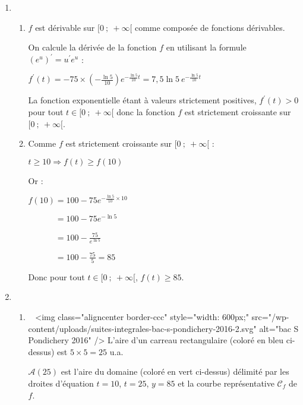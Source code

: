\begin{enumerate}
     \item
     \begin{enumerate}
          \item
          $f$ est dérivable sur $[0~;~+ \infty[$ comme composée de fonctions dérivables.
          \par
          On calcule la dérivée de la fonction $f$ en utilisant la formule $(e^u)^{\prime}=u^{\prime}e^u$ :
          \par
          $f^{\prime}(t)=-75 \times \left(-\frac{\ln 5}{10} \right){e}^{-\frac{\ln 5}{10}t}$$=7,5\ln5\ {e}^{-\frac{\ln 5}{10}t} $
          \par
          La fonction exponentielle étant à valeurs strictement positives, $f^{\prime}(t)  > 0$ pour tout $t \in [0~;~+ \infty[$ donc la fonction $f$ est strictement croissante sur $[0~;~+ \infty[$.
          \item
          Comme $f$ est strictement croissante sur $[0~;~+ \infty[$ :
          \par
          $t \geqslant 10 \Rightarrow f(t) \geqslant f(10)$
          \par
          Or :
          \par
          $f(10)=100-75{e}^{- \frac{\ln 5}{10} \times 10}$
          \par
          $\phantom{f(10)}=100-75{e}^{-\ln 5}$
          \par
          $\phantom{f(10)}=100-\frac{75}{{e}^{\ln 5}}$
          \par
          $\phantom{f(10)}=100-\frac{75}{5}=85$
          \par
          Donc pour tout $t \in [0~;~+ \infty[$, $f(t) \geqslant 85$.
     \end{enumerate}
     \item
     \begin{enumerate}
          \item
          ~
          <img class="aligncenter border-ccc" style="width: 600px;" src="/wp-content/uploads/suites-integrales-bac-s-pondichery-2016-2.svg" alt="bac S Pondichery 2016" />
          L'aire d'un carreau rectangulaire (coloré en bleu ci-dessus) est $5 \times 5 = 25$ u.a.
          \par
          $\mathcal{A}(25)$ est l'aire du domaine (coloré en vert ci-dessus) délimité par les droites d'équation $t = 10$, $t = 25$, $y = 85$ et la courbe représentative $\mathscr{C}_f$ de $f$.
          \par

\end{enumerate}
\end{enumerate}
